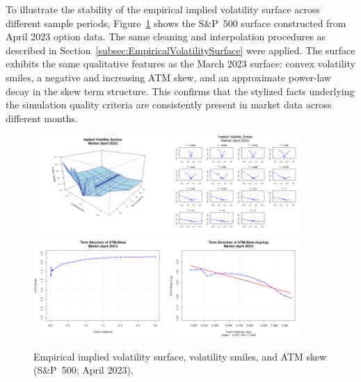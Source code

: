 To illustrate the stability of the empirical implied volatility surface across different sample periods, 
Figure~\ref{fig:MarketSurfaceApr2023} shows the S\&P~500 surface constructed from April 2023 option data. 
The same cleaning and interpolation procedures as described in Section~\ref{subsec:EmpiricalVolatilitySurface} 
were applied. The surface exhibits the same qualitative features as the March 2023 surface: convex volatility smiles, 
a negative and increasing ATM skew, and an approximate power-law decay in the skew term structure. 
This confirms that the stylized facts underlying the simulation quality criteria are consistently present 
in market data across different months.

\begin{figure}[H]
    \centering
    \includegraphics[width=0.45\textwidth]{figures/A.2 Additional Market Surface/market_apr-23_iv_surface.png}
    \includegraphics[width=0.45\textwidth]{figures/A.2 Additional Market Surface/market_apr-23_iv_smiles.png}
    \includegraphics[width=0.45\textwidth]{figures/A.2 Additional Market Surface/market_apr-23_atm_skew.png}
    \includegraphics[width=0.45\textwidth]{figures/A.2 Additional Market Surface/market_apr-23_atm_skew_log.png}
    \caption{Empirical implied volatility surface, volatility smiles, and ATM skew (S\&P~500; April 2023).}
    \label{fig:MarketSurfaceApr2023}
\end{figure}


